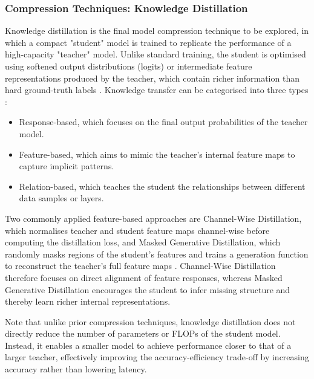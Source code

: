 \subsubsection{Compression Techniques: Knowledge Distillation}
Knowledge distillation is the final model compression technique to be explored, in which a compact "student" model is trained to replicate the performance of a high-capacity "teacher" model. Unlike standard training, the student is optimised using softened output distributions (logits) or intermediate feature representations produced by the teacher, which contain richer information than hard ground-truth labels \cite{Kaleem2024ACR, inbook}. Knowledge transfer can be categorised into three types \cite{Kaleem2024ACR}:
\begin{itemize}
    \item Response-based, which focuses on the final output probabilities of the teacher model.
    \item Feature-based, which aims to mimic the teacher's internal feature maps to capture implicit patterns.
    \item Relation-based, which teaches the student the relationships between different data samples or layers.
\end{itemize}
Two commonly applied feature-based approaches are Channel-Wise Distillation, which normalises teacher and student feature maps channel-wise before computing the distillation loss, and Masked Generative Distillation, which randomly masks regions of the student’s features and trains a generation function to reconstruct the teacher’s full feature maps \cite{Kaleem2024ACR}. Channel-Wise Distillation therefore focuses on direct alignment of feature responses, whereas Masked Generative Distillation encourages the student to infer missing structure and thereby learn richer internal representations.

Note that unlike prior compression techniques, knowledge distillation does not directly reduce the number of parameters or FLOPs of the student model. Instead, it enables a smaller model to achieve performance closer to that of a larger teacher, effectively improving the accuracy-efficiency trade-off by increasing accuracy rather than lowering latency.
